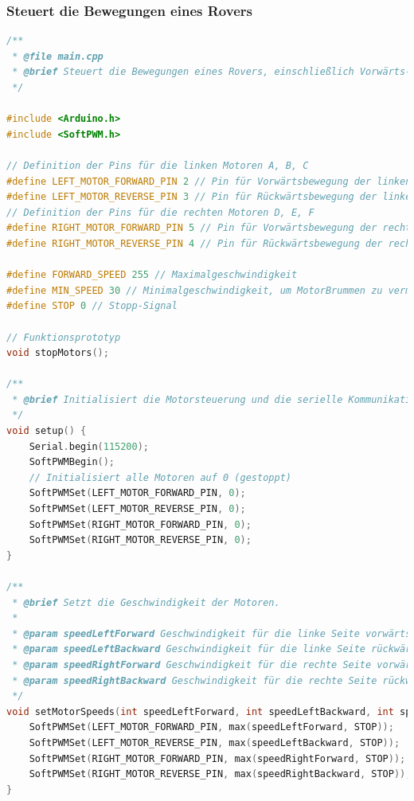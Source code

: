 \documentclass{vorlage-design-main}
\begin{document}
\hypertarget{steuert-die-bewegungen-eines-rovers}{%
\subsubsection{Steuert die Bewegungen eines
Rovers}\label{steuert-die-bewegungen-eines-rovers}}

\begin{lstlisting}[language={C++}]
/**
 * @file main.cpp
 * @brief Steuert die Bewegungen eines Rovers, einschließlich Vorwärts-, Rückwärtsbewegungen und Drehungen.
 */

#include <Arduino.h>
#include <SoftPWM.h>

// Definition der Pins für die linken Motoren A, B, C
#define LEFT_MOTOR_FORWARD_PIN 2 // Pin für Vorwärtsbewegung der linken Motoren (A, B, C)
#define LEFT_MOTOR_REVERSE_PIN 3 // Pin für Rückwärtsbewegung der linken Motoren (A, B, C)
// Definition der Pins für die rechten Motoren D, E, F
#define RIGHT_MOTOR_FORWARD_PIN 5 // Pin für Vorwärtsbewegung der rechten Motoren (D, E, F)
#define RIGHT_MOTOR_REVERSE_PIN 4 // Pin für Rückwärtsbewegung der rechten Motoren (D, E, F)

#define FORWARD_SPEED 255 // Maximalgeschwindigkeit
#define MIN_SPEED 30 // Minimalgeschwindigkeit, um MotorBrummen zu vermeiden
#define STOP 0 // Stopp-Signal

// Funktionsprototyp
void stopMotors(); 

/**
 * @brief Initialisiert die Motorsteuerung und die serielle Kommunikation.
 */
void setup() {
    Serial.begin(115200);
    SoftPWMBegin();
    // Initialisiert alle Motoren auf 0 (gestoppt)
    SoftPWMSet(LEFT_MOTOR_FORWARD_PIN, 0);
    SoftPWMSet(LEFT_MOTOR_REVERSE_PIN, 0);
    SoftPWMSet(RIGHT_MOTOR_FORWARD_PIN, 0);
    SoftPWMSet(RIGHT_MOTOR_REVERSE_PIN, 0);
}

/**
 * @brief Setzt die Geschwindigkeit der Motoren.
 * 
 * @param speedLeftForward Geschwindigkeit für die linke Seite vorwärts.
 * @param speedLeftBackward Geschwindigkeit für die linke Seite rückwärts.
 * @param speedRightForward Geschwindigkeit für die rechte Seite vorwärts.
 * @param speedRightBackward Geschwindigkeit für die rechte Seite rückwärts.
 */
void setMotorSpeeds(int speedLeftForward, int speedLeftBackward, int speedRightForward, int speedRightBackward) {
    SoftPWMSet(LEFT_MOTOR_FORWARD_PIN, max(speedLeftForward, STOP));
    SoftPWMSet(LEFT_MOTOR_REVERSE_PIN, max(speedLeftBackward, STOP));
    SoftPWMSet(RIGHT_MOTOR_FORWARD_PIN, max(speedRightForward, STOP));
    SoftPWMSet(RIGHT_MOTOR_REVERSE_PIN, max(speedRightBackward, STOP));
}


\end{lstlisting}
\end{document}
